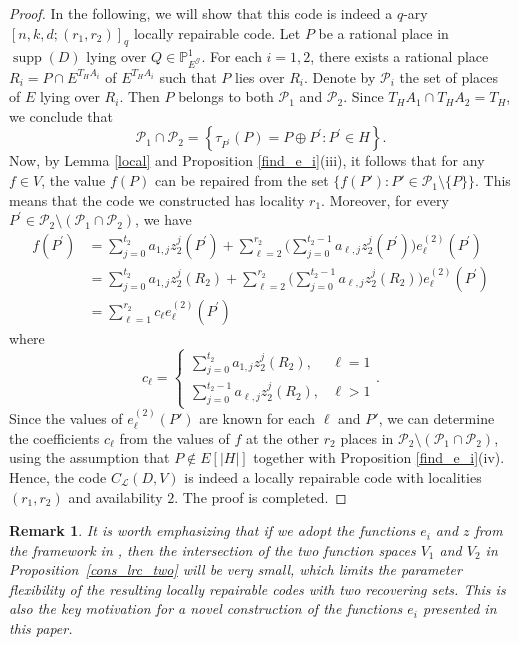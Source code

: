 \documentclass[journal,12pt,onecolumn]{IEEEtran}
\newtheorem{remark}{Remark}
\begin{document}
\begin{proof}
    In the following, we will show that this code is indeed a \( q \)-ary \([n, k, d; (r_1, r_2)]_q\) locally repairable code. Let $P$ be a rational place in $\operatorname{supp}(D)$ lying over \(Q\in\mathbb{P}_{E^\mathcal{G}}^1\). For each $i = 1, 2$, there exists a rational place $R_i = P\cap E^{T_H A_i}$ of $E^{T_H A_i}$ such that $P$ lies over $R_i$. Denote by $\mathcal{P}_i$ the set of places of $E$ lying over $R_i$. Then $P$ belongs to both $\mathcal{P}_1$ and $\mathcal{P}_2$. Since \(T_HA_1\cap T_HA_2 = T_H\), we conclude that 
    \[
        \mathcal{P}_1\cap \mathcal{P}_2 = \left\{\tau_{P^\prime}(P) = P\oplus P^\prime:P^\prime\in H\right\}. 
    \]
    Now, by Lemma \ref{local} and Proposition \ref{find_e_i}(iii), it follows that for any \(f \in V\), the value \(f(P)\) can be repaired from the set \(\{f(P') : P' \in \mathcal{P}_1 \setminus \{P\}\}\). This means that the code we constructed has locality \( r_1 \). Moreover, for every \(P^\prime\in \mathcal{P}_2\setminus(\mathcal{P}_1\cap \mathcal{P}_2)\), we have
    \begin{align*}
        f(P^\prime) &= \sum_{j=0}^{t_2}a_{1,j}z_2^j(P^\prime)+\sum_{\ell=2}^{r_2}\bigg(\sum_{j=0}^{t_2-1}a_{\ell,j}z_2^j(P^\prime)\bigg)e^{(2)}_\ell(P^\prime) \\
        & = \sum_{j=0}^{t_2}a_{1,j}z_2^j(R_2)+\sum_{\ell=2}^{r_2}\bigg(\sum_{j=0}^{t_2-1}a_{\ell,j}z_2^j(R_2)\bigg)e^{(2)}_\ell(P^\prime)\\
        & = \sum_{\ell=1}^{r_2} c_\ell e^{(2)}_\ell(P^\prime)
    \end{align*}
    where
    \[
        c_\ell = \begin{cases}
            \sum_{j=0}^{t_2}a_{1,j}z_2^j(R_2), &\ell = 1\\
            \sum_{j=0}^{t_2-1}a_{\ell,j}z_2^j(R_2), & \ell>1 
        \end{cases}. 
    \]
    Since the values of \(e^{(2)}_\ell(P')\) are known for each \(\ell\) and \(P'\), we can determine the coefficients \(c_\ell\) from the values of \(f\) at the other \(r_2\) places in \(\mathcal{P}_2 \setminus (\mathcal{P}_1 \cap \mathcal{P}_2)\), using the assumption that \(P \notin E[|H|]\) together with Proposition \ref{find_e_i}(iv). Hence, the code \( C_{\mathcal{L}}(D,V) \) is indeed a locally repairable code with localities \((r_1, r_2)\) and availability \( 2 \). The proof is completed. 
\end{proof}

\begin{remark}
    It is worth emphasizing that if we adopt the functions \( e_i \) and \( z \) from the framework in \cite{MA2023105686}, then the intersection of the two function spaces \( V_1 \) and \(V_2\) in Proposition~\ref{cons_lrc_two} will be very small, which limits the parameter flexibility of the resulting locally repairable codes with two recovering sets. This is also the key motivation for a novel construction of the functions \(e_i\) presented in this paper. 
\end{remark}
\end{document}
